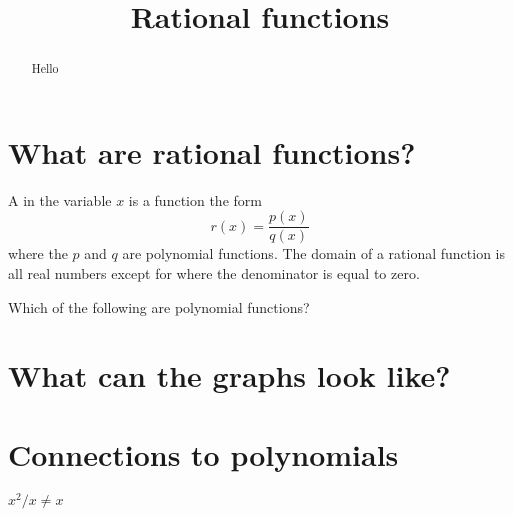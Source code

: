 \documentclass{ximera}
\title[Dig-In:]{Rational functions}
\begin{document}
\begin{abstract}
  Hello
\end{abstract}
\maketitle




\section{What are rational functions?}

\begin{definition}
  A  in the variable $x$ is a function the form
  \[
  r(x) = \frac{p(x)}{q(x)}
  \]
  where the $p$ and $q$ are polynomial functions. The domain of a
  rational function is all real numbers except for where the
  denominator is equal to zero.
\end{definition}

\begin{question}
  Which of the following are polynomial functions?
  \begin{multipleChoice}
  \end{multipleChoice}
\end{question}


\section{What can the graphs look like?}


\section{Connections to polynomials}


$x^2/x \ne x$
\end{document}
